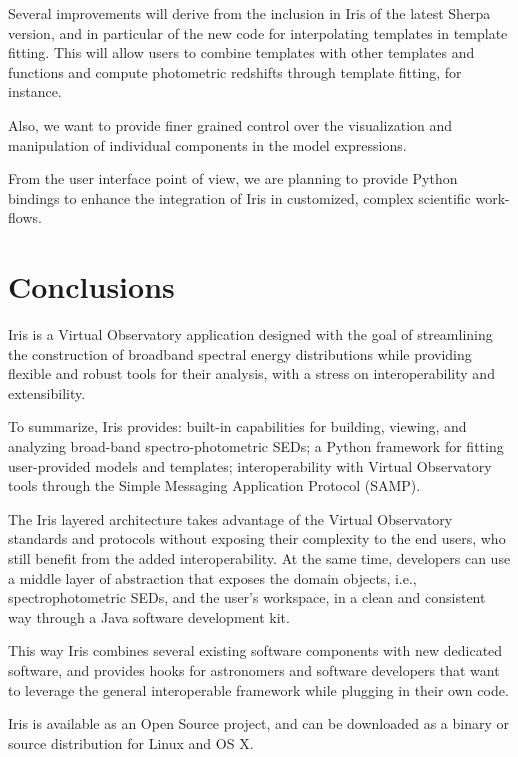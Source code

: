 \documentclass[preprint,authoryear,5p]{elsarticle}
\begin{document}
Several improvements will derive from the inclusion in Iris of the latest Sherpa
version, and in particular of the new code for interpolating templates in
template fitting. This will allow users to combine templates with other
templates and functions and compute photometric redshifts through template
fitting, for instance.

Also, we want to provide finer grained control over the visualization and
manipulation of individual components in the model expressions.

From the user interface point of view, we are planning to provide Python
bindings to enhance the integration of Iris in customized, complex scientific
work-flows.

\section{Conclusions} \label{sec:conclusions}

Iris is a Virtual Observatory application designed with the goal of streamlining
the construction of broadband spectral energy distributions while providing
flexible and robust tools for their analysis, with a stress on interoperability
and extensibility.

To summarize, Iris provides: built-in capabilities for building, viewing, and
analyzing broad-band spec\-tro-pho\-to\-met\-ric SEDs; a Python framework for fitting
user-pro\-vid\-ed models and templates; interoperability with Virtual Observatory
tools through the Simple Messaging Application Protocol (SAMP).

The Iris layered architecture takes advantage of the Virtual Observatory
standards and protocols without exposing their complexity to the end users,
who still benefit from the added interoperability. At the same time, developers
can use a middle layer of abstraction that exposes the domain objects, i.e.,
spectrophotometric SEDs, and the user's workspace, in a clean and consistent
way through a Java software development kit.

\begin{sloppypar}
This way Iris combines several existing software components with new dedicated
software, and provides hooks for astronomers and software developers that want to
leverage the general interoperable framework while plugging in their own code.
\end{sloppypar}

Iris is available as an Open Source project, and can be downloaded as a binary
or source distribution for Linux and OS X.
\end{document}
